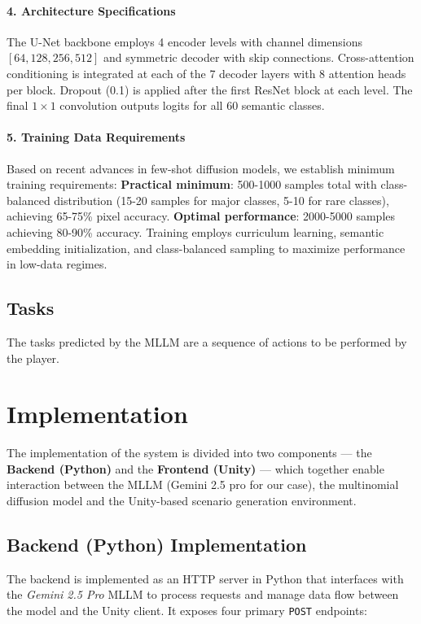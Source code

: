 \documentclass{article}
\begin{document}
\paragraph{4. Architecture Specifications}
The U-Net backbone employs 4 encoder levels with channel dimensions $[64, 128, 256, 512]$ and symmetric decoder with skip connections. Cross-attention conditioning is integrated at each of the 7 decoder layers with 8 attention heads per block. Dropout (0.1) is applied after the first ResNet block at each level. The final $1 \times 1$ convolution outputs logits for all 60 semantic classes.

\paragraph{5. Training Data Requirements}
Based on recent advances in few-shot diffusion models, we establish minimum training requirements: \textbf{Practical minimum}: 500-1000 samples total with class-balanced distribution (15-20 samples for major classes, 5-10 for rare classes), achieving 65-75\% pixel accuracy. \textbf{Optimal performance}: 2000-5000 samples achieving 80-90\% accuracy. Training employs curriculum learning, semantic embedding initialization, and class-balanced sampling to maximize performance in low-data regimes.


\subsection{Tasks}

The tasks predicted by the MLLM are a sequence of actions to be performed by the player. %

\section{Implementation}

The implementation of the system is divided into two components — the \textbf{Backend (Python)} and the \textbf{Frontend (Unity)} — which together enable interaction between the MLLM (Gemini 2.5 pro for our case), the multinomial diffusion model and the Unity-based scenario generation environment.

\subsection{Backend (Python) Implementation}

The backend is implemented as an HTTP server in Python that interfaces with the \textit{Gemini 2.5 Pro} MLLM to process requests and manage data flow between the model and the Unity client. 
It exposes four primary \texttt{POST} endpoints:
\end{document}
